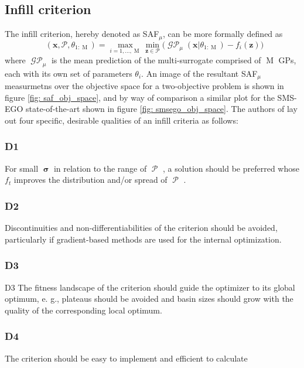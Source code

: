 \documentclass[conference]{IEEEtran}
\DeclareMathOperator*{\paretofront}{\mathcal{P}}
\DeclareMathOperator*{\nobj}{M}
\DeclareMathOperator*{\msafmu}{SAF_\mu}
\DeclareMathOperator*{\mgp}{\mathcal{GP}}
\DeclareMathOperator{\posterioruncertainty}{\bm{\sigma}}
\newcommand\safmu{SAF$_{\mu}$\xspace}
\newcommand\gps{GPs\xspace}
\newcommand\mP{\mathcal{P}}
\newcommand{\bx}{\mathbf{x}}
\newcommand{\bz}{\mathbf{z}}
\begin{document}
\subsection{Infill criterion}\label{section: infill_criterion}
The infill criterion, hereby denoted as \safmu, can be more formally defined as
\begin{equation}\label{eqn: SAF}
  \msafmu(\mathbf{x}, \mathcal{P}, \theta_{1:\nobj}) = %
  \max_{i=1,\ldots, \nobj} \min_{\bz \in \mP} \big(\mgp_{\mu}(\bx|\theta_{1:\nobj}) - f_i(\bz)\big)
\end{equation}
where $\mgp_{\mu}$ is the mean prediction of the multi-surrogate comprised of $\nobj$ \gps, each with its own set of parameters $\theta_i$. An image of the resultant \safmu measurmetns over the objective space for a two-objective problem is shown in figure \ref{fig: saf_obj_space}, and by way of comparison a similar plot for the SMS-EGO state-of-the-art shown in figure \ref{fig: smsego_obj_space}. The authors of \cite{wagner2010expected} lay out four specific, desirable qualities of an infill criteria as follows:

\subsubsection{D1}
For small $\posterioruncertainty$ in relation to the range of $\paretofront$ , a solution should be preferred whose $f_t$ improves the distribution and/or spread of $\paretofront$ .

\subsubsection{D2}
Discontinuities and non-differentiabilities of the criterion should be avoided, particularly if gradient-based methods are used for the internal optimization.

\subsubsection{D3}
D3 The fitness landscape of the criterion should guide the optimizer to its global optimum, e. g., plateaus should be avoided and basin sizes should grow with the quality of the corresponding local optimum.

\subsubsection{D4}
The criterion should be easy to implement and efficient to calculate
\end{document}

